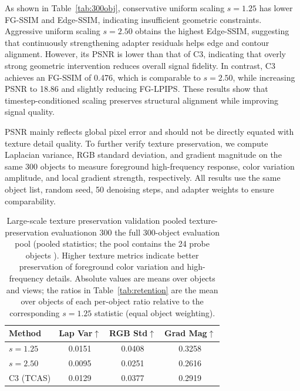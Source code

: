 \documentclass[times,twocolumn,final]{elsarticle}
\providecommand{\DIFadd}[1]{{\protect\color{blue} \sf #1}} %
\providecommand{\DIFdel}[1]{{\protect\color{red} \scriptsize #1}} %
\providecommand{\DIFaddFL}[1]{\DIFadd{#1}} %
\providecommand{\DIFdelFL}[1]{\DIFdel{#1}} %
\providecommand{\DIFaddbeginFL}{} %
\providecommand{\DIFaddendFL}{} %
\providecommand{\DIFdelbeginFL}{} %
\providecommand{\DIFdelendFL}{} %
\newcommand{\DIFscaledelfig}{0.5}
\newlength{\DIFdelgraphicswidth} %
\newlength{\DIFdelgraphicsheight} %
\newcommand{\DIFaddincludegraphics}[2][]{{\color{blue}\fbox{\DIFOincludegraphics[#1]{#2}}}} %
\newcommand{\DIFdelincludegraphics}[2][]{%
\sbox{\DIFdelgraphicsbox}{\DIFOincludegraphics[#1]{#2}}%
\settoboxwidth{\DIFdelgraphicswidth}{\DIFdelgraphicsbox} %
\settoboxtotalheight{\DIFdelgraphicsheight}{\DIFdelgraphicsbox} %
\scalebox{\DIFscaledelfig}{%
\parbox[b]{\DIFdelgraphicswidth}{\usebox{\DIFdelgraphicsbox}\\[-\baselineskip] \rule{\DIFdelgraphicswidth}{0em}}\llap{\resizebox{\DIFdelgraphicswidth}{\DIFdelgraphicsheight}{%
\setlength{\unitlength}{\DIFdelgraphicswidth}%
\begin{picture}(1,1)%
\thicklines\linethickness{2pt} %
{\color[rgb]{1,0,0}\put(0,0){\framebox(1,1){}}}%
{\color[rgb]{1,0,0}\put(0,0){\line( 1,1){1}}}%
{\color[rgb]{1,0,0}\put(0,1){\line(1,-1){1}}}%
\end{picture}%
}\hspace*{3pt}}} %
} %
\DeclareRobustCommand{\DIFaddbeginFL}{\DIFOaddbeginFL \let\includegraphics\DIFaddincludegraphics} %
\DeclareRobustCommand{\DIFaddendFL}{\DIFOaddendFL \let\includegraphics\DIFOincludegraphics} %
\DeclareRobustCommand{\DIFdelbeginFL}{\DIFOdelbeginFL \let\includegraphics\DIFdelincludegraphics} %
\DeclareRobustCommand{\DIFdelendFL}{\DIFOaddendFL \let\includegraphics\DIFOincludegraphics} %
\begin{document}
As shown in Table~\ref{tab:300obj}, conservative uniform scaling $s = 1.25$ has lower FG-SSIM and Edge-SSIM, indicating insufficient geometric constraints. Aggressive uniform scaling $s = 2.50$ obtains the highest Edge-SSIM, suggesting that continuously strengthening adapter residuals helps edge and contour alignment. However, its PSNR is lower than that of C3, indicating that overly strong geometric intervention reduces overall signal fidelity. In contrast, C3 achieves an FG-SSIM of 0.476, which is comparable to $s = 2.50$, while increasing PSNR to 18.86 and slightly reducing FG-LPIPS. These results show that timestep-conditioned scaling preserves structural alignment while improving signal quality.

PSNR mainly reflects global pixel error and should not be directly equated with texture detail quality. To further verify texture preservation, we compute Laplacian variance, RGB standard deviation, and gradient magnitude on the same 300 objects to measure foreground high-frequency response, color variation amplitude, and local gradient strength, respectively. All results use the same object list, random seed, 50 denoising steps, and adapter weights to ensure comparability.


\begin{table}[t]
\centering
\caption{Large-scale \DIFdelbeginFL \DIFdelFL{texture preservation validation}\DIFdelendFL \DIFaddbeginFL \DIFaddFL{pooled texture-preservation evaluation}\DIFaddendFL on \DIFdelbeginFL \DIFdelFL{300 }\DIFdelendFL \DIFaddbeginFL \DIFaddFL{the full 300-object evaluation pool (pooled statistics; the pool contains the 24 probe }\DIFaddendFL objects\DIFaddbeginFL \DIFaddFL{)}\DIFaddendFL . Higher texture metrics indicate better preservation of foreground color variation and high-frequency details. \DIFaddbeginFL \DIFaddFL{Absolute values are means over objects and views; the ratios in Table~\ref{tab:retention} are the mean over objects of each per-object ratio relative to the corresponding $s = 1.25$ statistic (equal object weighting).}\DIFaddendFL }
\label{tab:texture300}
\small
\begin{tabular}{lccc}
\toprule
Method & Lap Var$\uparrow$ & RGB Std$\uparrow$ & Grad Mag$\uparrow$ \\
\midrule
$s = 1.25$ & 0.0151 & 0.0408 & 0.3258 \\
$s = 2.50$ & 0.0095 & 0.0251 & 0.2616 \\
C3 (TCAS) & 0.0129 & 0.0377 & 0.2919 \\
\bottomrule
\end{tabular}
\end{table}
\end{document}
